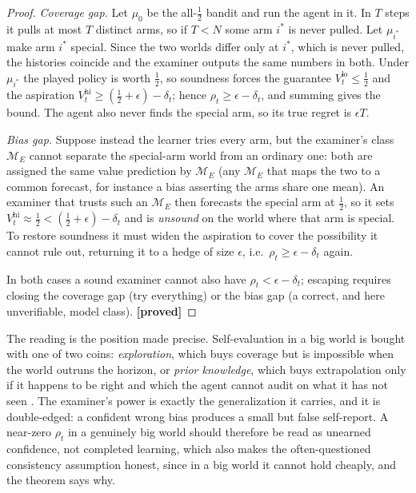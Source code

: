 \documentclass[10pt]{article} %
\theoremstyle{definition}
\theoremstyle{plain}
\newcommand{\ModE}{\mathcal{M}_E}
\newcommand{\Vlow}{V^{\mathrm{lo}}_t}
\newcommand{\Vhi}{V^{\mathrm{hi}}_t}
\begin{document}
\begin{proof}
\emph{Coverage gap.} Let $\mu_0$ be the all-$\tfrac12$ bandit and run the agent in it. In $T$ steps it pulls at most $T$ distinct arms, so if $T < N$ some arm $i^{*}$ is never pulled. Let $\mu_{i^{*}}$ make arm $i^{*}$ special. Since the two worlds differ only at $i^{*}$, which is never pulled, the histories coincide and the examiner outputs the same numbers in both. Under $\mu_{i^{*}}$ the played policy is worth $\tfrac12$, so soundness forces the guarantee $\Vlow \le \tfrac12$ and the aspiration $\Vhi \ge (\tfrac12+\epsilon) - \delta_t$; hence $\rho_t \ge \epsilon - \delta_t$, and summing gives the bound. The agent also never finds the special arm, so its true regret is $\epsilon T$.

\emph{Bias gap.} Suppose instead the learner tries every arm, but the examiner's class $\ModE$ cannot separate the special-arm world from an ordinary one: both are assigned the same value prediction by $\ModE$ (any $\ModE$ that maps the two to a common forecast, for instance a bias asserting the arms share one mean). An examiner that trusts such an $\ModE$ then forecasts the special arm at $\tfrac12$, so it sets $\Vhi \approx \tfrac12 < (\tfrac12+\epsilon) - \delta_t$ and is \emph{unsound} on the world where that arm is special. To restore soundness it must widen the aspiration to cover the possibility it cannot rule out, returning it to a hedge of size $\epsilon$, i.e.\ $\rho_t \ge \epsilon - \delta_t$ again.

In both cases a sound examiner cannot also have $\rho_t < \epsilon - \delta_t$; escaping requires closing the coverage gap (try everything) or the bias gap (a correct, and here unverifiable, model class). \textbf{[proved]}
\end{proof}

The reading is the position made precise. Self-evaluation in a big world is bought with one of two coins: \emph{exploration}, which buys coverage but is impossible when the world outruns the horizon, or \emph{prior knowledge}, which buys extrapolation only if it happens to be right and which the agent cannot audit on what it has not seen \citep{osband2013psrl,russo2017ids}. The examiner's power is exactly the generalization it carries, and it is double-edged: a confident wrong bias produces a small but false self-report. A near-zero $\rho_t$ in a genuinely big world should therefore be read as unearned confidence, not completed learning, which also makes the often-questioned consistency assumption honest, since in a big world it cannot hold cheaply, and the theorem says why.
\end{document}
